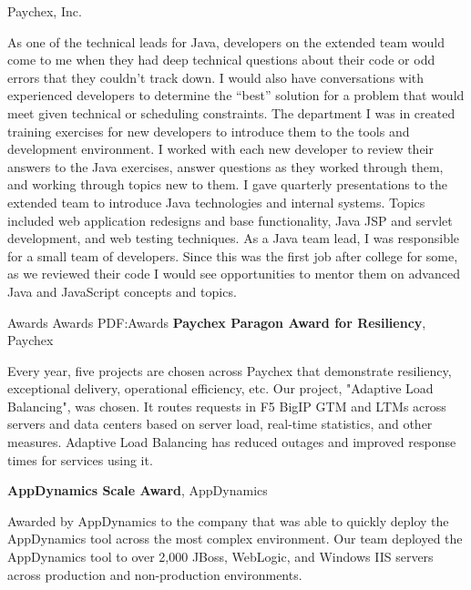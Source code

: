 \documentclass[letterpaper,MMMMyyyy,nonstopmode]{simpleresumecv}
\begin{document}
\begin{Body}
Paychex, Inc.
\begin{Detail}
\BulletItem
As one of the technical leads for Java, developers on the extended team would come to me when they had deep technical questions about their code or odd errors that they couldn't track down. I would also have conversations with experienced developers to determine the ``best'' solution for a problem that would meet given technical or scheduling constraints.
\BulletItem
The department I was in created training exercises for new developers to introduce them to the tools and development environment. I worked with each new developer to review their answers to the Java exercises,  answer questions as they worked through them, and working through topics new to them.
\BulletItem
I gave quarterly presentations to the extended team to introduce Java technologies and internal systems. Topics included web application redesigns and base functionality, Java JSP and servlet development, and web testing techniques.
\BulletItem
As a Java team lead, I was responsible for a small team of developers. Since this was the first job after college for some, as we reviewed their code I would see opportunities to mentor them on advanced Java and JavaScript concepts and topics.
\end{Detail}
\fi      %

\Section
{Awards}
{Awards}
{PDF:Awards}
\textbf{Paychex Paragon Award for Resiliency}, Paychex
\hfill
{}
\begin{Detail}
Every year, five projects are chosen across Paychex that demonstrate resiliency, exceptional delivery, operational efficiency, etc.
Our project, "Adaptive Load Balancing", was chosen. It routes requests in F5 BigIP GTM and LTMs across servers and data centers based on server load, real-time statistics, and other measures. Adaptive Load Balancing has reduced outages and improved response times for services using it.
\end{Detail}
\BigGap

\textbf{AppDynamics Scale Award}, AppDynamics
\hfill
{}
\begin{Detail}
Awarded by AppDynamics to the company that was able to quickly deploy the AppDynamics tool across the most complex environment. Our team deployed the AppDynamics tool to over 2,000 JBoss, WebLogic, and Windows IIS servers across production and non-production environments.
\end{Detail}


\end{Body}
\end{document}
